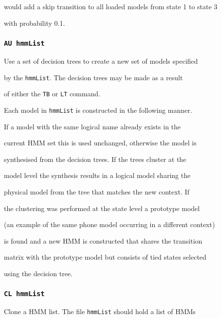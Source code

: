 would add a skip transition to all loaded models from state 1 to state 3


with probability 0.1.





\subsubsection*{\tt AU hmmList}





Use a set of decision trees to create a new set of models specified


by the \texttt{hmmList}.  The decision trees may be made as a result


of either the \texttt{TB} or \texttt{LT} command.  





Each model in \texttt{hmmList} is constructed in the following manner.


If a model with the same logical name already exists in the


current  HMM set this is used unchanged, otherwise the model is


synthesised from the decision trees.  If the trees cluster at the 


model level the synthesis results in a logical model sharing the


physical model from the tree that matches the new context.  If


the clustering was performed at the state level a prototype model


(an example of the same phone model occurring in a different context)


is found and a new HMM is constructed  that shares the transition


matrix with the prototype model but consists of tied states selected


using the decision tree.





\subsubsection*{\tt CL hmmList}





Clone a HMM list.  The file \texttt{hmmList} should hold a list of HMMs


